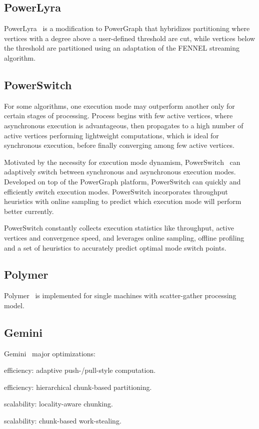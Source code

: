 \documentclass[UTF8,12pt,a4paper]{article}
\begin{document}
\subsection{PowerLyra}
PowerLyra~\cite{DBLP:conf/eurosys/ChenSCC15}
is a modification to PowerGraph that hybridizes partitioning
where vertices with a degree above a user-defined threshold are cut,
while vertices below the threshold are partitioned using
an adaptation of the FENNEL streaming algorithm.

\subsection{PowerSwitch}
For some algorithms, one execution mode may outperform another
only for certain stages of processing.
Process begins with few active vertices,
where asynchronous execution is advantageous,
then propagates to a high number of active vertices performing lightweight computations,
which is ideal for synchronous execution,
before finally converging among few active vertices.

Motivated by the necessity for execution mode dynamism,
PowerSwitch~\cite{DBLP:conf/ppopp/XieCGZC15}
can adaptively switch between synchronous and asynchronous execution modes.
Developed on top of the PowerGraph platform,
PowerSwitch can quickly and efficiently switch execution modes.
PowerSwitch incorporates throughput heuristics with online sampling
to predict which execution mode will perform better currently.

PowerSwitch constantly collects execution statistics
like throughput, active vertices and convergence speed,
and leverages online sampling, offline profiling and a set of heuristics
to accurately predict optimal mode switch points.

\subsection{Polymer}
Polymer~\cite{DBLP:conf/ppopp/ZhangCC15} is implemented for
single machines with scatter-gather processing model.

\subsection{Gemini}
Gemini~\cite{DBLP:conf/osdi/ZhuCZM16} major optimizations:
\begin{compactitem}
  \item efficiency: adaptive push-/pull-style computation.
  \item efficiency: hierarchical chunk-based	partitioning.
  \item scalability: locality-aware	chunking.
  \item scalability: chunk-based work-stealing.
\end{compactitem}
\end{document}
